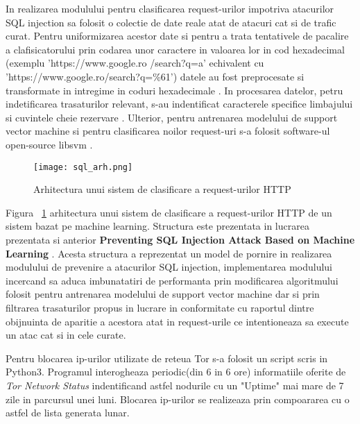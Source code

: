 In realizarea modulului pentru clasificarea request-urilor impotriva atacurilor SQL injection sa folosit o colectie de date reale atat de atacuri cat si de trafic curat. Pentru uniformizarea acestor date si pentru a trata tentativele de pacalire a clafisicatorului prin codarea unor caractere in valoarea lor in cod hexadecimal (exemplu 'https://www.google.ro /search?q=a' echivalent cu 'https://www.google.ro/search?q=\%61') datele au fost preprocesate si transformate in intregime in coduri hexadecimale \cite{ascii}. In procesarea datelor, petru indetificarea trasaturilor relevant, s-au indentificat caracterele specifice limbajului \cite{char_sql} si cuvintele cheie rezervare \cite{key_sql}. Ulterior, pentru antrenarea modelului de support vector machine si pentru clasificarea noilor request-uri s-a folosit software-ul open-source libsvm \cite{libsvm_class}. 

\begin{figure}[h]
	\centering
	\texttt{[image: sql\_arh.png]}
	\caption{Arhitectura unui sistem de clasificare a request-urilor HTTP}
	\label{fig:sql-arh}
\end{figure}

Figura ~\ref{fig:sql-arh} arhitectura unui sistem de clasificare a request-urilor HTTP de un sistem bazat pe machine learning. Structura este prezentata in lucrarea prezentata si anterior \textbf{Preventing SQL Injection Attack Based on Machine Learning} \cite{sqli_how}. Acesta structura a reprezentat un model de pornire in realizarea modulului de prevenire a atacurilor SQL injection, implementarea modulului incercand sa aduca imbunatatiri de performanta prin modificarea algoritmului folosit pentru antrenarea modelului de support vector machine dar si prin filtrarea trasaturilor propus in lucrare in conformitate cu raportul dintre obijnuinta de aparitie a acestora atat in request-urile ce intentioneaza sa execute un atac cat si in cele curate.

Pentru blocarea ip-urilor utilizate de reteua Tor s-a folosit un script scris in Python3. Programul interogheaza periodic(din 6 in 6 ore) informatiile oferite de \textit{Tor Network Status} \cite{tot_status} indentificand astfel nodurile cu un "Uptime" mai mare de 7 zile in parcursul unei luni. Blocarea ip-urilor se realizeaza prin compoararea cu o astfel de lista generata lunar.

